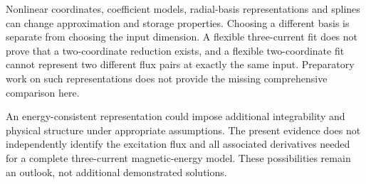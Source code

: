 Nonlinear coordinates, coefficient models, radial-basis representations and splines can change approximation and storage properties. Choosing a different basis is separate from choosing the input dimension. A flexible three-current fit does not prove that a two-coordinate reduction exists, and a flexible two-coordinate fit cannot represent two different flux pairs at exactly the same input. Preparatory work on such representations does not provide the missing comprehensive comparison here.

An energy-consistent representation could impose additional integrability and physical structure under appropriate assumptions. The present evidence does not independently identify the excitation flux and all associated derivatives needed for a complete three-current magnetic-energy model. These possibilities remain an outlook, not additional demonstrated solutions.
\FloatBarrier
